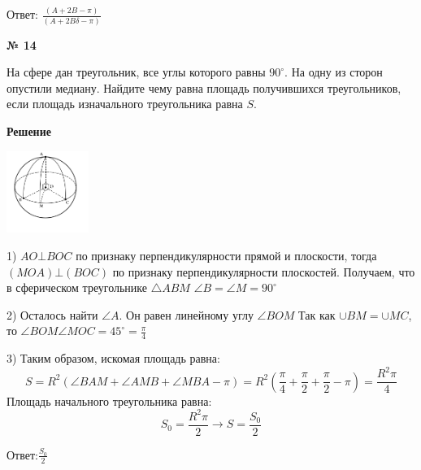     Ответ: $\frac{(A + 2B - \pi)}{(A + 2B\delta - \pi)}$

    \begin{center}
        \textbf{№ 14}
    \end{center}

    На сфере дан треугольник, все углы которого равны $90^\circ$.
    На одну из сторон опустили медиану.
    Найдите чему равна площадь получившихся треугольников, если площадь изначального треугольника равна $S$.

    \textbf{Решение}\\

    \begin{center}
        \includegraphics[width=0.2\textwidth]{images/img9}\\
    \end{center}

    1) $AO\bot BOC$ по признаку перпендикулярности прямой и плоскости, тогда $(MOA)\bot(BOC)$ по признаку перпендикулярности
    плоскостей.
    Получаем, что в сферическом треугольнике $\triangle ABM$ $\angle B = \angle M = 90^\circ$

    2) Осталось найти $\angle A$.
    Он равен линейному углу $\angle BOM$
    Так как $\cup BM = \cup MC$, то $\angle BOM \angle MOC = 45^\circ = \frac{\pi}{4}$

    3) Таким образом, искомая площадь равна:
    \[
        S = R^2(\angle BAM + \angle AMB + \angle MBA - \pi) =
        R^2\left(\frac{\pi}{4} + \frac{\pi}{2}+ \frac{\pi}{2} - \pi\right) =
        \frac{R^2\pi}{4}
    \]
    Площадь начального треугольника равна:
    \[
        S_0 = \frac{R^2\pi}{2} \rightarrow S = \frac{S_0}{2}
    \]

    Ответ:$\frac{S_0}{2}$



